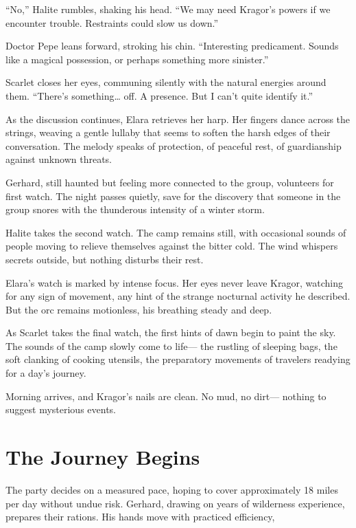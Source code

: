 \documentclass[
  letterpaper,12pt,twoside,twocolumn,openany,
  nodeprecatedcode,bg=full]{dndbook}
\begin{document}
``No,'' Halite rumbles, shaking his head. ``We may need Kragor's powers
if we encounter trouble. Restraints could slow us down.''

Doctor Pepe leans forward, stroking his chin. ``Interesting predicament.
Sounds like a magical possession, or perhaps something more sinister.''

Scarlet closes her eyes, communing silently with the natural energies
around them. ``There's something\ldots{} off. A presence. But I can't
quite identify it.''

As the discussion continues, Elara retrieves her harp. Her fingers dance
across the strings, weaving a gentle lullaby that seems to soften the
harsh edges of their conversation. The melody speaks of protection, of
peaceful rest, of guardianship against unknown threats.

Gerhard, still haunted but feeling more connected to the group,
volunteers for first watch. The night passes quietly, save for the
discovery that someone in the group snores with the thunderous intensity
of a winter storm.

Halite takes the second watch. The camp remains still, with occasional
sounds of people moving to relieve themselves against the bitter cold.
The wind whispers secrets outside, but nothing disturbs their rest.

Elara's watch is marked by intense focus. Her eyes never leave Kragor,
watching for any sign of movement, any hint of the strange nocturnal
activity he described. But the orc remains motionless, his breathing
steady and deep.

As Scarlet takes the final watch, the first hints of dawn begin to paint
the sky. The sounds of the camp slowly come to life--- the rustling of
sleeping bags, the soft clanking of cooking utensils, the preparatory
movements of travelers readying for a day's journey.

Morning arrives, and Kragor's nails are clean. No mud, no dirt---
nothing to suggest mysterious events.

\section{The Journey Begins}\label{the-journey-begins}

The party decides on a measured pace, hoping to cover approximately 18
miles per day without undue risk. Gerhard, drawing on years of
wilderness experience, prepares their rations. His hands move with
practiced efficiency,
\end{document}
